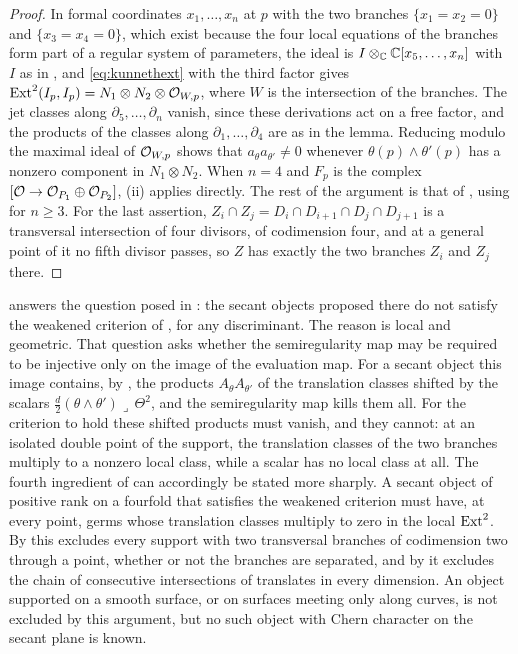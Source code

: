 \begin{proof}
In formal coordinates $x_{1},\dots,x_{n}$ at $p$ with the two branches
$\{x_{1}=x_{2}=0\}$ and $\{x_{3}=x_{4}=0\}$, which exist because the four
local equations of the branches form part of a regular system of
parameters, the ideal is
$I\otimes_{\mathbb{C}}\mathbb{C}[x_{5},\dots,x_{n}]$ with $I$ as in ,
and \eqref{eq:kunnethext} with the third factor gives
$\operatorname{Ext}^{2}(I_{p},I_{p})=N_{1}\otimes N_{2}\otimes\mathcal{O}_{W,p}$, where $W$ is the
intersection of the branches. The jet classes along $\partial_{5},\dots,\partial_{n}$
vanish, since these derivations act on a free factor, and the products of the
classes along $\partial_{1},\dots,\partial_{4}$ are as in the lemma. Reducing
modulo the maximal ideal of $\mathcal{O}_{W,p}$ shows that $a_{\theta}a_{\theta'}\ne0$
whenever $\theta(p)\wedge\theta'(p)$ has a nonzero component in
$N_{1}\otimes N_{2}$. When $n=4$ and $F_{p}$ is the complex
$[\mathcal{O}\to\mathcal{O}_{P_{1}}\oplus\mathcal{O}_{P_{2}}]$, (ii) applies
directly. The rest of the argument is that of
, using  for $n\ge3$. For the last
assertion, $Z_{i}\cap Z_{j}=D_{i}\cap D_{i+1}\cap D_{j}\cap D_{j+1}$ is a
transversal intersection of four divisors, of codimension four, and at a
general point of it no fifth divisor passes, so $Z$ has exactly the two
branches $Z_{i}$ and $Z_{j}$ there.
\end{proof}

\begin{remark}\label{rem:candidatemeaning}
 answers the question posed in
\cite[Section 12]{Mar25b}: the secant objects proposed there do not satisfy
the weakened criterion of \cite[Question 11.4]{Mar25b}, for any
discriminant. The reason is local and geometric. That question asks whether
the semiregularity map may be required to be injective only on the image of
the evaluation map. For a secant object this image contains, by
, the products $A_{\theta}A_{\theta'}$ of the translation
classes shifted by the scalars
$\tfrac d2(\theta\wedge\theta')\lrcorner\,\Theta^{2}$, and the
semiregularity map kills them all. For the criterion to hold these shifted
products must vanish, and they cannot: at an isolated double point of the
support, the translation classes of the two branches multiply to a nonzero
local class, while a scalar has no local class at all. The fourth ingredient
of  can accordingly be stated more sharply. A secant
object of positive rank on a fourfold that satisfies the weakened criterion
must have, at every point, germs whose translation classes multiply to zero
in the local $\operatorname{Ext}^{2}$. By  this excludes every
support with two transversal branches of codimension two through a point,
whether or not the branches are separated, and by
 it excludes the chain of consecutive
intersections of translates in every dimension. An object supported on a
smooth surface, or on surfaces meeting only along curves, is not excluded by
this argument, but no such object with Chern character on the secant plane
is known.
\end{remark}
